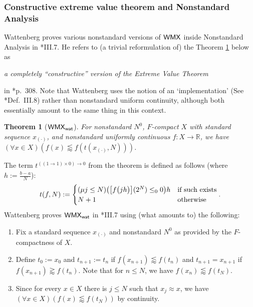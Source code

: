 \documentclass[reqno]{amsart}
\newtheorem{thm}{Theorem}
\newcommand\be{\begin{equation}}
\newcommand\ee{\end{equation}}
\def\R{{\mathbb  R}}
\def\R{{\mathbb{R}}}
\def\di{\rightarrow}
\def\WMX{\textup{\textsf{WMX}}}
\def\wat{\textup{\textsf{wat}}}
\numberwithin{equation}{section}
\numberwithin{thm}{section}
\begin{document}
%



\subsubsection{Constructive extreme value theorem and Nonstandard Analysis}\label{goof}
Wattenberg proves various nonstandard versions of $\WMX$ inside Nonstandard Analysis in \cite{watje}*{III.7}.  
He refers to (a trivial reformulation of)  the Theorem \ref{wakko4} below as 
\begin{center}
\emph{a completely ``constructive'' version of the Extreme Value Theorem}
\end{center}
in \cite{watje}*{p.\ 308}.  Note that Wattenberg uses the notion of an `implementation' (See \cite{watje}*{Def.\ III.8}) rather than nonstandard uniform continuity, although both essentially amount to the same thing in this context.  
\begin{thm}[$\WMX_{\textsf{\wat}}$]\label{wakko4}
For nonstandard $N^{0}$, $F$-compact $X$ with standard sequence $x_{(\cdot)}$, and nonstandard uniformly continuous $f:X\di \R$, we have $(\forall x\in X)(f(x)\lessapprox f(t(x_{(\cdot)}, N)))$.  
\end{thm}\noindent
The term $t^{((1\di 1)\times 0)\di 0}$ from the theorem is defined as follows (where $h:=\frac{b-a}{N}$):
\be\label{teke}
t(f,N):=
\begin{cases}
(\mu j \leq N)\big(\big[f\big(jh\big)\big](2^{N})\leq_{0} 0\big)h & \textup{if such exists}\\
N+1 & \textup{otherwise}
\end{cases}.
\ee
Wattenberg proves $\WMX_{\wat}$ in \cite{watje}*{III.7} using (what amounts to) the following:
\begin{enumerate}  
\renewcommand{\theenumi}{\roman{enumi}}
\item Fix a standard sequence $x_{(\cdot)}$ and nonstandard $N^{0}$ as provided by the $F$-compactness of $X$. \label{koer2}
\item Define $t_{0}:=x_{0}$ and $t_{n+1}:= t_{n}$ if $f(x_{n+1})\lessapprox f(t_{n})$ and $t_{n+1}=x_{n+1}$ if $f(x_{n+1})\gtrapprox f(t_{n})$.  Note that for $n\leq N$, we have $f(x_{n})\lessapprox f(t_{N})$. \label{fra2g}
\item Since for every $x\in X$ there is $j\leq N$ such that $x_{j}\approx x$, we have $(\forall x\in X)(f(x)\lessapprox f(t_{N}))$ by continuity.  \label{cruxjes2}
\end{enumerate}
\end{document}
